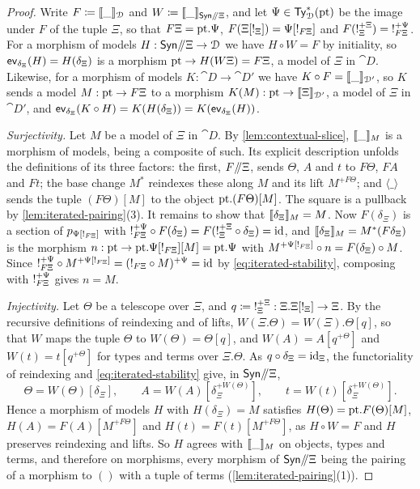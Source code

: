 \begin{proof}
    Write $F \coloneqq \llbracket\_\rrbracket_{\mathcal{D}}$ and $W \coloneqq \llbracket\_\rrbracket_{\mathsf{Syn}\mathord{/\mkern-5mu/} \Xi}$, and let $\Psi \in \mathsf{Ty}^*_{\mathcal{D}}(\mathrm{pt})$ be the image under $F$ of the tuple $\Xi$, so that $F\Xi = \mathrm{pt}.\Psi$, $F(\Xi[{!}_\Xi]) = \Psi[{!}_{F\Xi}]$ and $F({!}_\Xi^{+\Xi}) = {!}_{F\Xi}^{+\Psi}$. For a morphism of models $H : \mathsf{Syn}\mathord{/\mkern-5mu/} \Xi \to \mathcal{D}$ we have $H \circ W = F$ by initiality, so $\mathsf{ev}_{\delta_\Xi}(H) = H(\delta_\Xi)$ is a morphism $\mathrm{pt} \to H(W\Xi) = F\Xi$, a model of $\Xi$ in $\cat{D}$. Likewise, for a morphism of models $K : \cat{D} \to \cat{D}'$ we have $K \circ F = \llbracket\_\rrbracket_{\mathcal{D}'}$, so $K$ sends a model $M : \mathrm{pt} \to F\Xi$ to a morphism $K(M) : \mathrm{pt} \to \llbracket\Xi\rrbracket_{\mathcal{D}'}$, a model of $\Xi$ in $\cat{D}'$, and $\mathsf{ev}_{\delta_\Xi}(K \circ H) = K(H(\delta_\Xi)) = K(\mathsf{ev}_{\delta_\Xi}(H))$.

    \emph{Surjectivity.} Let $M$ be a model of $\Xi$ in $\cat{D}$. By \cref{lem:contextual-slice}, $\llbracket\_\rrbracket_M$ is a morphism of models, being a composite of such. Its explicit description unfolds the definitions of its three factors: the first, $F\mathord{/\mkern-5mu/} \Xi$, sends $\Theta$, $A$ and $t$ to $F\Theta$, $FA$ and $Ft$; the base change $M^*$ reindexes these along $M$ and its lift $M^{+F\Theta}$; and $\langle \_ \rangle$ sends the tuple $(F\Theta)[M]$ to the object $\mathrm{pt}.(F\Theta)[M]$. The square is a pullback by \cref{lem:iterated-pairing}(3). It remains to show that $\llbracket\delta_\Xi\rrbracket_M = M$. Now $F(\delta_\Xi)$ is a section of $p_{\Psi[{!}_{F\Xi}]}$ with ${!}_{F\Xi}^{+\Psi} \circ F(\delta_\Xi) = F({!}_\Xi^{+\Xi} \circ \delta_\Xi) = \mathrm{id}$, and $\llbracket\delta_\Xi\rrbracket_M = M^*(F\delta_\Xi)$ is the morphism $n : \mathrm{pt} \to \mathrm{pt}.\Psi[{!}_{F\Xi}][M] = \mathrm{pt}.\Psi$ with $M^{+\Psi[{!}_{F\Xi}]} \circ n = F(\delta_\Xi) \circ M$. Since ${!}_{F\Xi}^{+\Psi} \circ M^{+\Psi[{!}_{F\Xi}]} = ({!}_{F\Xi} \circ M)^{+\Psi} = \mathrm{id}$ by \eqref{eq:iterated-stability}, composing with ${!}_{F\Xi}^{+\Psi}$ gives $n = M$.

    \emph{Injectivity.} Let $\Theta$ be a telescope over $\Xi$, and $q \coloneqq {!}_\Xi^{+\Xi} : \Xi.\Xi[{!}_\Xi] \to \Xi$. By the recursive definitions of reindexing and of lifts, $W(\Xi.\Theta) = W(\Xi).\Theta[q]$, so that $W$ maps the tuple $\Theta$ to $W(\Theta) = \Theta[q]$, and $W(A) = A[q^{+\Theta}]$ and $W(t) = t[q^{+\Theta}]$ for types and terms over $\Xi.\Theta$. As $q \circ \delta_\Xi = \mathrm{id}_\Xi$, the functoriality of reindexing and \eqref{eq:iterated-stability} give, in $\mathsf{Syn}\mathord{/\mkern-5mu/} \Xi$,
    \[
        \Theta = W(\Theta)[\delta_\Xi], \qquad A = W(A)[\delta_\Xi^{+W(\Theta)}], \qquad t = W(t)[\delta_\Xi^{+W(\Theta)}].
    \]
    Hence a morphism of models $H$ with $H(\delta_\Xi) = M$ satisfies $H(\Theta) = \mathrm{pt}.F(\Theta)[M]$, $H(A) = F(A)[M^{+F\Theta}]$ and $H(t) = F(t)[M^{+F\Theta}]$, as $H \circ W = F$ and $H$ preserves reindexing and lifts. So $H$ agrees with $\llbracket\_\rrbracket_M$ on objects, types and terms, and therefore on morphisms, every morphism of $\mathsf{Syn}\mathord{/\mkern-5mu/} \Xi$ being the pairing of a morphism to $()$ with a tuple of terms (\cref{lem:iterated-pairing}(1)).
\end{proof}

